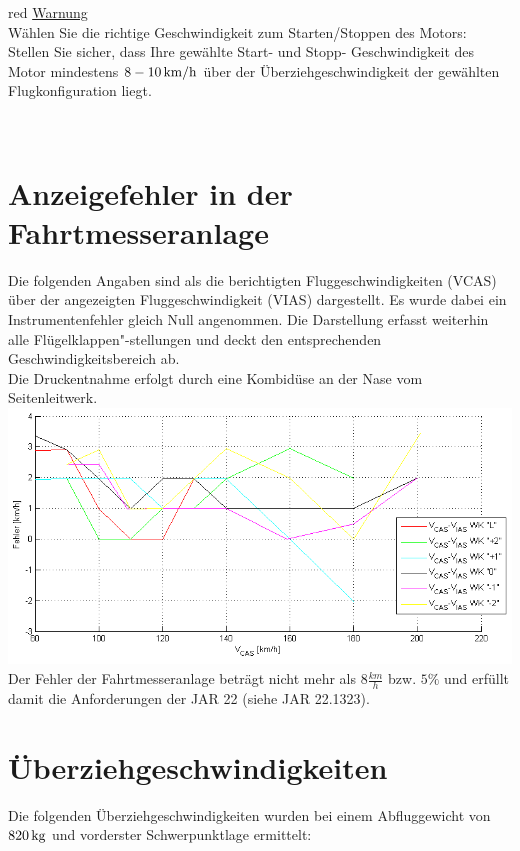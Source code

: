\begin{color}{red}
\large{\underline{Warnung}}\\
Wählen Sie die richtige Geschwindigkeit zum Starten/Stoppen des Motors: \\
Stellen Sie sicher, dass Ihre gewählte Start- und Stopp- Geschwindigkeit des Motor mindestens $\unit[8-10]{km/h}$ über der Überziehgeschwindigkeit der gewählten Flugkonfiguration liegt.
\end{color}\\
\newpage
\section{Anzeigefehler in der Fahrtmesseranlage}
Die folgenden Angaben sind als die berichtigten Fluggeschwindigkeiten (VCAS) über der angezeigten Fluggeschwindigkeit (VIAS) dargestellt. Es wurde dabei ein Instrumentenfehler gleich Null angenommen. Die Darstellung erfasst weiterhin alle Flügelklappen"-stellungen und deckt den entsprechenden Geschwindigkeitsbereich ab.\\
\newline
Die Druckentnahme erfolgt durch eine Kombidüse an der Nase vom Seitenleitwerk.\\
\newline
\includegraphics[width=.9\textwidth]{fahrtmesserkalibrierung.png}
\newline
Der Fehler der Fahrtmesseranlage beträgt nicht mehr als $8 \frac{km}{h}$ bzw. $5\%$ und erfüllt damit die Anforderungen der JAR 22 (siehe JAR 22.1323).

\section{Überziehgeschwindigkeiten}

Die folgenden Überziehgeschwindigkeiten wurden bei einem Abfluggewicht von $\unit[820]{kg}$ und vorderster Schwerpunktlage ermittelt:

